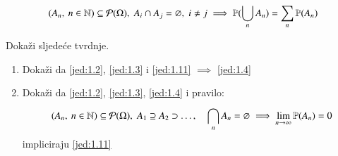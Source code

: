 \begin{equation} \label{jed:1.11}
    (A_n, \: n \in \mathbb{N}) \subseteq \mathcal{P}({\Omega}), \; A_i \cap A_j = \varnothing, \; i \neq j \implies \mathbb{P}({\bigcup\limits_{n}^{} A_n}) = \sum\limits_{n}^{} \mathbb{P}({A_n})
\end{equation}

\begin{zad} \label{zad:1.12}
    Doka\v zi sljede\' ce tvrdnje.
    \begin{enumerate}[label=(\alph*)]
        \item Doka\v zi da \eqref{jed:1.2}, \eqref{jed:1.3} i \eqref{jed:1.11} $\implies$ \eqref{jed:1.4}
        \item Doka\v zi da \eqref{jed:1.2}, \eqref{jed:1.3}, \eqref{jed:1.4} i pravilo:
        \begin{equation} \label{jed:1.13}
            (A_n, \: n \in \mathbb{N}) \subseteq \mathcal{P}({\Omega}), \; A_1 \supseteq A_2 \supset \dots, \quad \bigcap\limits_{n}^{} A_n = \varnothing \implies \lim_{n \to \infty} \mathbb{P}({A_n}) = 0
        \end{equation}
        impliciraju \eqref{jed:1.11}
    \end{enumerate}
\end{zad}


